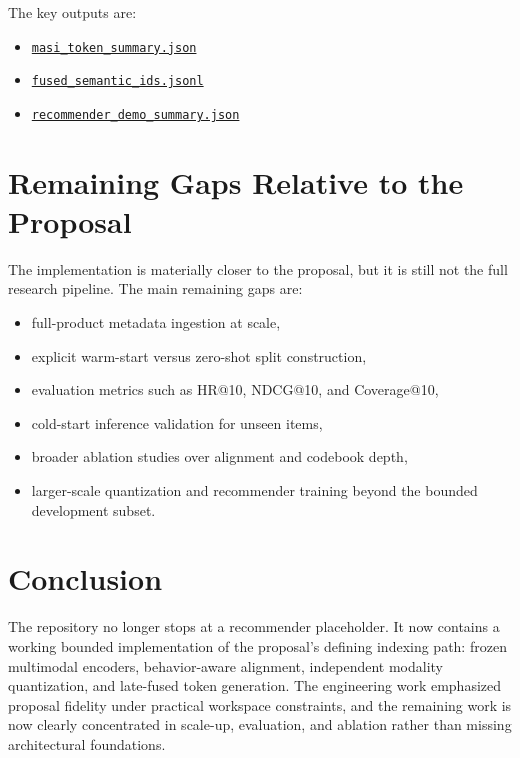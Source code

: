 \documentclass[11pt]{article}
\begin{document}
The key outputs are:
\begin{itemize}[leftmargin=1.5em]
    \item \href{/Users/pradyundevarakonda/Developer/MASI/outputs/masi_tokens_amazon_csj_demo/masi_token_summary.json}{\texttt{masi\_token\_summary.json}}
    \item \href{/Users/pradyundevarakonda/Developer/MASI/outputs/masi_tokens_amazon_csj_demo/fused_semantic_ids.jsonl}{\texttt{fused\_semantic\_ids.jsonl}}
    \item \href{/Users/pradyundevarakonda/Developer/MASI/outputs/recommender_amazon_csj_demo/recommender_demo_summary.json}{\texttt{recommender\_demo\_summary.json}}
\end{itemize}

\section{Remaining Gaps Relative to the Proposal}
The implementation is materially closer to the proposal, but it is still not the full research pipeline. The main remaining gaps are:
\begin{itemize}[leftmargin=1.5em]
    \item full-product metadata ingestion at scale,
    \item explicit warm-start versus zero-shot split construction,
    \item evaluation metrics such as HR@10, NDCG@10, and Coverage@10,
    \item cold-start inference validation for unseen items,
    \item broader ablation studies over alignment and codebook depth,
    \item larger-scale quantization and recommender training beyond the bounded development subset.
\end{itemize}

\section{Conclusion}
The repository no longer stops at a recommender placeholder. It now contains a working bounded implementation of the proposal's defining indexing path: frozen multimodal encoders, behavior-aware alignment, independent modality quantization, and late-fused token generation. The engineering work emphasized proposal fidelity under practical workspace constraints, and the remaining work is now clearly concentrated in scale-up, evaluation, and ablation rather than missing architectural foundations.
\end{document}
